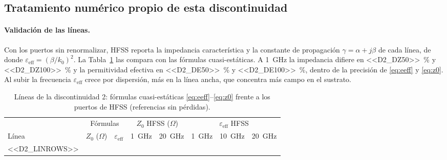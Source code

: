 \documentclass[11pt,letterpaper]{article}
\begin{document}
\subsection{Tratamiento numérico propio de esta discontinuidad}

\paragraph{Validación de las líneas.} Con los puertos sin renormalizar, HFSS reporta la impedancia característica y la constante de propagación $\gamma=\alpha+j\beta$ de cada línea, de donde $\varepsilon_{\mathrm{eff}}=(\beta/k_0)^2$. La Tabla~\ref{tab:dlineas} las compara con las fórmulas cuasi-estáticas. A \SI{1}{GHz} la impedancia difiere en \SI{<<D2_DZ50>>}{\percent} y \SI{<<D2_DZ100>>}{\percent} y la permitividad efectiva en \SI{<<D2_DE50>>}{\percent} y \SI{<<D2_DE100>>}{\percent}, dentro de la precisión de \eqref{eq:eeff} y \eqref{eq:z0}. Al subir la frecuencia $\varepsilon_{\mathrm{eff}}$ crece por dispersión, más en la línea ancha, que concentra más campo en el sustrato.

\begin{table}[htbp]
\centering
\caption{Líneas de la discontinuidad 2: fórmulas cuasi-estáticas \eqref{eq:eeff}--\eqref{eq:z0} frente a los puertos de HFSS (referencias sin pérdidas).}
\label{tab:dlineas}
\small
\setlength{\tabcolsep}{4.5pt}
\begin{tabular}{lccccccc}
\toprule
 & \multicolumn{2}{c}{Fórmulas} & \multicolumn{2}{c}{$Z_0$ HFSS ($\Omega$)} & \multicolumn{3}{c}{$\varepsilon_{\mathrm{eff}}$ HFSS} \\
\cmidrule(lr){2-3}\cmidrule(lr){4-5}\cmidrule(lr){6-8}
Línea & $Z_0$ ($\Omega$) & $\varepsilon_{\mathrm{eff}}$ & \SI{1}{GHz} & \SI{20}{GHz} & \SI{1}{GHz} & \SI{10}{GHz} & \SI{20}{GHz} \\
\midrule
<<D2_LINROWS>>
\bottomrule
\end{tabular}
\end{table}
\end{document}

